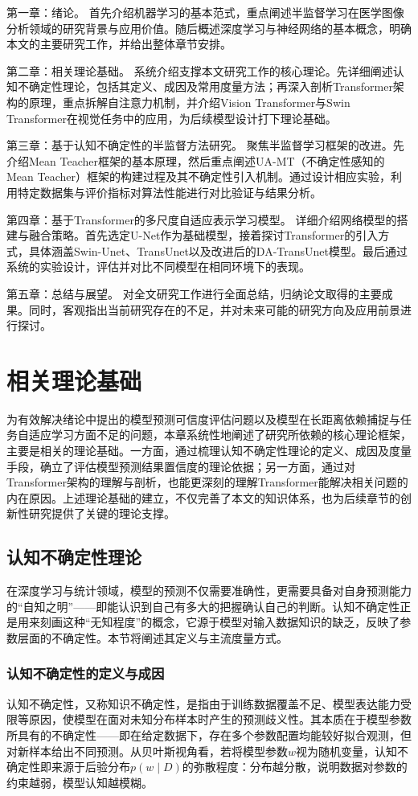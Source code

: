 \documentclass{xduugthesis}
\begin{document}
第一章：绪论。 首先介绍机器学习的基本范式，重点阐述半监督学习在医学图像分析领域的研究背景与应用价值。随后概述深度学习与神经网络的基本概念，明确本文的主要研究工作，并给出整体章节安排。

第二章：相关理论基础。 系统介绍支撑本文研究工作的核心理论。先详细阐述认知不确定性理论，包括其定义、成因及常用度量方法；再深入剖析Transformer架构的原理，重点拆解自注意力机制，并介绍Vision Transformer与Swin Transformer在视觉任务中的应用，为后续模型设计打下理论基础。

第三章：基于认知不确定性的半监督方法研究。 聚焦半监督学习框架的改进。先介绍Mean Teacher框架的基本原理，然后重点阐述UA-MT（不确定性感知的Mean Teacher）框架的构建过程及其不确定性引入机制。通过设计相应实验，利用特定数据集与评价指标对算法性能进行对比验证与结果分析。

第四章：基于Transformer的多尺度自适应表示学习模型。 详细介绍网络模型的搭建与融合策略。首先选定U-Net作为基础模型，接着探讨Transformer的引入方式，具体涵盖Swin-Unet、TransUnet以及改进后的DA-TransUnet模型。最后通过系统的实验设计，评估并对比不同模型在相同环境下的表现。

第五章：总结与展望。 对全文研究工作进行全面总结，归纳论文取得的主要成果。同时，客观指出当前研究存在的不足，并对未来可能的研究方向及应用前景进行探讨。

\chapter{相关理论基础}
为有效解决绪论中提出的模型预测可信度评估问题以及模型在长距离依赖捕捉与任务自适应学习方面不足的问题，本章系统性地阐述了研究所依赖的核心理论框架，主要是相关的理论基础。一方面，通过梳理认知不确定性理论的定义、成因及度量手段，确立了评估模型预测结果置信度的理论依据；另一方面，通过对Transformer架构的理解与剖析，也能更深刻的理解Transformer能解决相关问题的内在原因。上述理论基础的建立，不仅完善了本文的知识体系，也为后续章节的创新性研究提供了关键的理论支撑。

\section{认知不确定性理论}
在深度学习与统计领域，模型的预测不仅需要准确性，更需要具备对自身预测能力的“自知之明”——即能认识到自己有多大的把握确认自己的判断。认知不确定性正是用来刻画这种“无知程度”的概念，它源于模型对输入数据知识的缺乏，反映了参数层面的不确定性。本节将阐述其定义与主流度量方式。

\subsection{认知不确定性的定义与成因}
认知不确定性，又称知识不确定性，是指由于训练数据覆盖不足、模型表达能力受限等原因，使模型在面对未知分布样本时产生的预测歧义性。其本质在于模型参数所具有的不确定性——即在给定数据下，存在多个参数配置均能较好拟合观测，但对新样本给出不同预测。从贝叶斯视角看，若将模型参数$w$视为随机变量，认知不确定性即来源于后验分布$p(w\mid D)$的弥散程度：分布越分散，说明数据对参数的约束越弱，模型认知越模糊。
\end{document}
